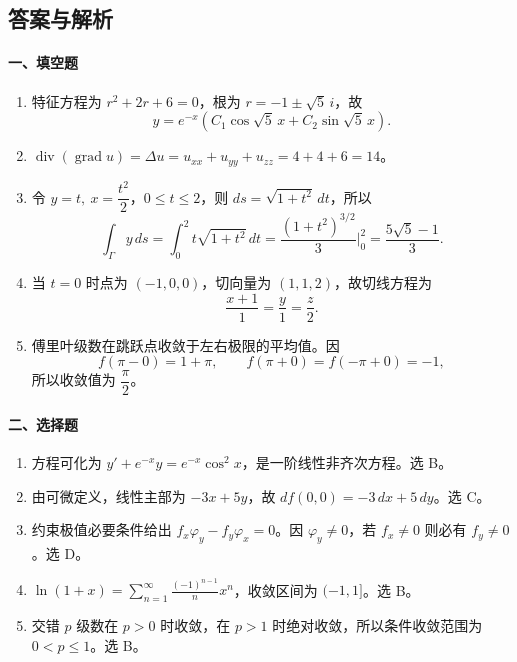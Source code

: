 \subsection{答案与解析}

\paragraph*{一、填空题}
\begin{enumerate}
  \item 特征方程为 $r^2+2r+6=0$，根为 $r=-1\pm\sqrt5\,i$，故
  \[
    y=e^{-x}\left(C_1\cos\sqrt5\,x+C_2\sin\sqrt5\,x\right).
  \]
  \item $\operatorname{div}(\operatorname{grad}u)=\Delta u=u_{xx}+u_{yy}+u_{zz}=4+4+6=14$。
  \item 令 $y=t,\ x=\dfrac{t^2}{2}$，$0\le t\le2$，则 $ds=\sqrt{1+t^2}\,dt$，所以
  \[
    \int_\Gamma y\,ds=\int_0^2 t\sqrt{1+t^2}\,dt
    =\frac{(1+t^2)^{3/2}}{3}\bigg|_0^2
    =\frac{5\sqrt5-1}{3}.
  \]
  \item 当 $t=0$ 时点为 $(-1,0,0)$，切向量为 $(1,1,2)$，故切线方程为
  \[
    \frac{x+1}{1}=\frac{y}{1}=\frac{z}{2}.
  \]
  \item 傅里叶级数在跳跃点收敛于左右极限的平均值。因
  \[
    f(\pi-0)=1+\pi,\qquad f(\pi+0)=f(-\pi+0)=-1,
  \]
  所以收敛值为 $\dfrac{\pi}{2}$。
\end{enumerate}

\paragraph*{二、选择题}
\begin{enumerate}
  \item 方程可化为 \(y'+e^{-x}y=e^{-x}\cos^2x\)，是一阶线性非齐次方程。选 B。
  \item 由可微定义，线性主部为 \(-3x+5y\)，故 \(df(0,0)=-3\,dx+5\,dy\)。选 C。
  \item 约束极值必要条件给出 \(f_x\varphi_y-f_y\varphi_x=0\)。因 \(\varphi_y\ne0\)，若 \(f_x\ne0\) 则必有 \(f_y\ne0\)。选 D。
  \item \(\displaystyle \ln(1+x)=\sum_{n=1}^{\infty}\frac{(-1)^{n-1}}{n}x^n\)，收敛区间为 $(-1,1]$。选 B。
  \item 交错 $p$ 级数在 $p>0$ 时收敛，在 $p>1$ 时绝对收敛，所以条件收敛范围为 $0<p\le1$。选 B。
\end{enumerate}

